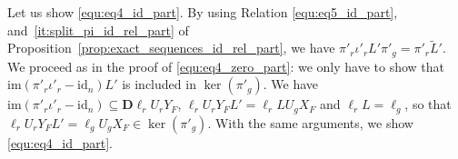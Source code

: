 \documentclass[10pt]{article}
\newcommand\g[1]{\textbf{#1}}
\newcommand\id[1]{\text{id}_{#1}}
\newcommand\im[1]{\text{im}\left(#1\right)}
\newcommand\D{\g{D}}
\begin{document}
Let us show \eqref{equ:eq4_id_part}. By using Relation
\eqref{equ:eq5_id_part}, and~\ref{it:split_pi_id_rel_part} of
Proposition~\ref{prop:exact_sequences_id_rel_part}, we have $\pi'_r
\iota'_rL'\pi'_g=\pi'_r\tilde{L}'$. We proceed as in the proof of
\eqref{equ:eq4_zero_part}: we only have to show that $\im{\pi'_r\iota'_r
  -\id{n}}L'$ is included in $\ker\left(\pi'_g\right)$. We have $\im{
  \pi'_r\iota'_r-\id{n}}\subseteq\D\ell_rU_rY_F$, $\ell_rU_rY_FL'=\ell_r
LU_gX_F$ and $\ell_rL=\ell_g$, so that $\ell_rU_rY_FL'=\ell_gU_gX_F\in
\ker(\pi'_g)$. With the same arguments, we show \eqref{equ:eq4_id_part}.

\end{document}
